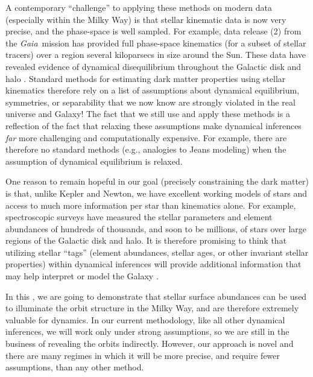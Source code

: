 \documentclass[modern]{aastex63}
\newcommand{\gaia}{\textsl{Gaia}}
\newcommand{\dr}[1]{\acronym{DR}#1}
\begin{document}
A contemporary ``challenge'' to applying these methods on modern data
(especially within the Milky Way) is that stellar kinematic data is now very
precise, and the phase-space is well sampled.
For example, data release (\dr{2}) from the \gaia\ mission
\citep{Gaia-Collaboration:2016, Gaia-Collaboration:2018} has provided full
phase-space kinematics (for a subset of stellar tracers) over a region several
kiloparsecs in size around the Sun.
These data have revealed evidence of dynamical disequilibrium throughout the
Galactic disk and halo \citep{Antoja:2018, Myeong:2018, Koppelman:2018,
Eilers:2020}.
Standard methods for estimating dark matter properties using stellar kinematics
therefore rely on a list of assumptions about dynamical equilibrium, symmetries,
or separability that we now know are strongly violated in the real universe and
Galaxy!
The fact that we still use and apply these methods is a reflection of the fact
that relaxing these assumptions make dynamical inferences \emph{far} more
challenging and computationally expensive.
For example, there are therefore no standard methods (e.g., analogies to Jeans
modeling) when the assumption of dynamical equilibrium is relaxed.

One reason to remain hopeful in our goal (precisely constraining the dark
matter) is that, unlike Kepler and Newton, we have excellent working models of
stars and access to much more information per star than kinematics alone.
For example, spectroscopic surveys have measured the stellar parameters and
element abundances of hundreds of thousands, and soon to be millions, of stars
\citep[e.g.,][]{DR16, Martell:2017, Deng:2012} over large regions of the
Galactic disk and halo.
It is therefore promising to think that utilizing stellar ``tags'' (element
abundances, stellar ages, or other invariant stellar properties) within
dynamical inferences will provide additional information that may help interpret
or model the Galaxy \citep[see, e.g.,][for recent methods that begin to move in
this direction, within the context of equilibrium models]{Sanders:2015,
Das:2016, Binney:2016, Iorio:2020}.

In this \documentname, we are going to demonstrate that stellar surface
abundances can be used to illuminate the orbit structure in the Milky Way, and
are therefore extremely valuable for dynamics.
In our current methodology, like all other dynamical inferences, we will work
only under strong assumptions, so we are still in the business of revealing the
orbits indirectly.
However, our approach is novel and there are many regimes in which it will be
more precise, and require fewer assumptions, than any other method.
\end{document}
